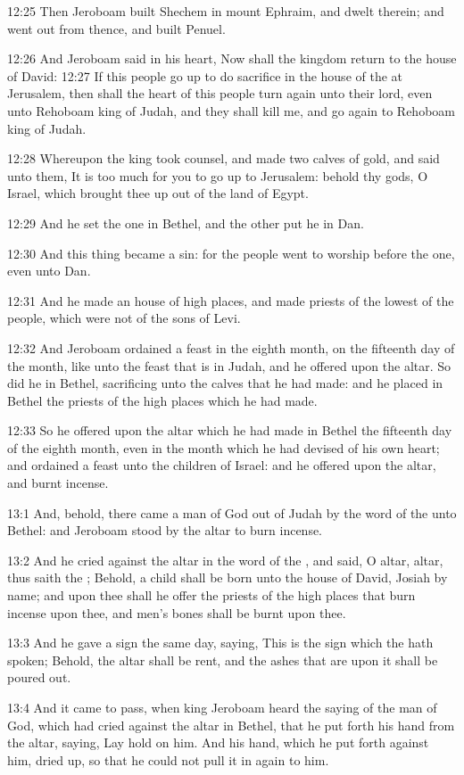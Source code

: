 12:25 Then Jeroboam built Shechem in mount Ephraim, and dwelt therein; and went out from thence, and built Penuel.

12:26 And Jeroboam said in his heart, Now shall the kingdom return to the house of David: 12:27 If this people go up to do sacrifice in the house of the \LORD at Jerusalem, then shall the heart of this people turn again unto their lord, even unto Rehoboam king of Judah, and they shall kill me, and go again to Rehoboam king of Judah.

12:28 Whereupon the king took counsel, and made two calves of gold, and said unto them, It is too much for you to go up to Jerusalem: behold thy gods, O Israel, which brought thee up out of the land of Egypt.

12:29 And he set the one in Bethel, and the other put he in Dan.

12:30 And this thing became a sin: for the people went to worship before the one, even unto Dan.

12:31 And he made an house of high places, and made priests of the lowest of the people, which were not of the sons of Levi.

12:32 And Jeroboam ordained a feast in the eighth month, on the fifteenth day of the month, like unto the feast that is in Judah, and he offered upon the altar. So did he in Bethel, sacrificing unto the calves that he had made: and he placed in Bethel the priests of the high places which he had made.

12:33 So he offered upon the altar which he had made in Bethel the fifteenth day of the eighth month, even in the month which he had devised of his own heart; and ordained a feast unto the children of Israel: and he offered upon the altar, and burnt incense.

13:1 And, behold, there came a man of God out of Judah by the word of the \LORD unto Bethel: and Jeroboam stood by the altar to burn incense.

13:2 And he cried against the altar in the word of the \LORD, and said, O altar, altar, thus saith the \LORD; Behold, a child shall be born unto the house of David, Josiah by name; and upon thee shall he offer the priests of the high places that burn incense upon thee, and men's bones shall be burnt upon thee.

13:3 And he gave a sign the same day, saying, This is the sign which the \LORD hath spoken; Behold, the altar shall be rent, and the ashes that are upon it shall be poured out.

13:4 And it came to pass, when king Jeroboam heard the saying of the man of God, which had cried against the altar in Bethel, that he put forth his hand from the altar, saying, Lay hold on him. And his hand, which he put forth against him, dried up, so that he could not pull it in again to him.

